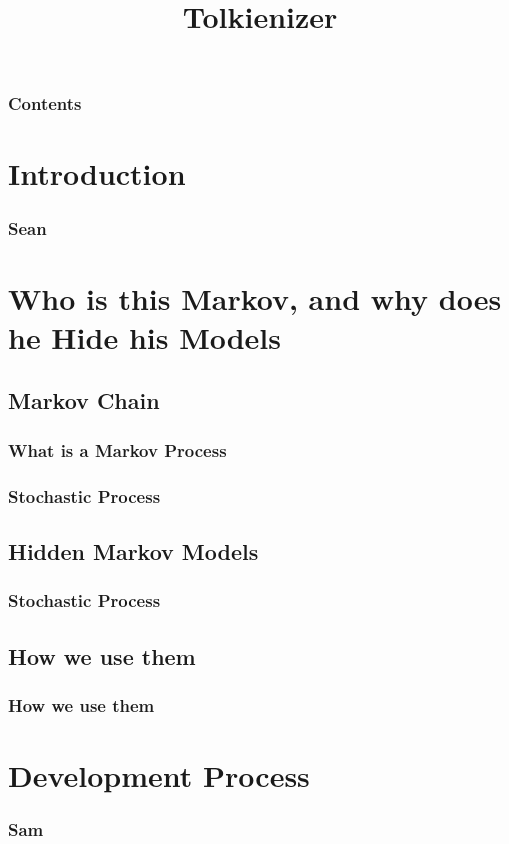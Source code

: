 \documentclass{beamer}
\title[Tolkienizer]{Tolkienizer}
\begin{document}
\begin{frame}
\titlepage
\end{frame}

\begin{frame}
   \frametitle{Contents}
   \tableofcontents[pausesections]
\end{frame}

\section{Introduction}

\begin{frame}
   \frametitle{Sean}
\end{frame}

\section{Who is this Markov, and why does he Hide his Models}

\subsection{Markov Chain}

\begin{frame}
   \frametitle{What is a Markov Process}
\end{frame}

\begin{frame}
   \frametitle{}
\end{frame}

\begin{frame}
   \frametitle{Stochastic Process}
\end{frame}

\subsection{Hidden Markov Models}
\begin{frame}
   \frametitle{}
\end{frame}

\begin{frame}
   \frametitle{Stochastic Process}
\end{frame}

\subsection{How we use them}
\begin{frame}
   \frametitle{How we use them}
\end{frame}

\section{Development Process}

\begin{frame}
   \frametitle{Sam}
\end{frame}
\end{document}
